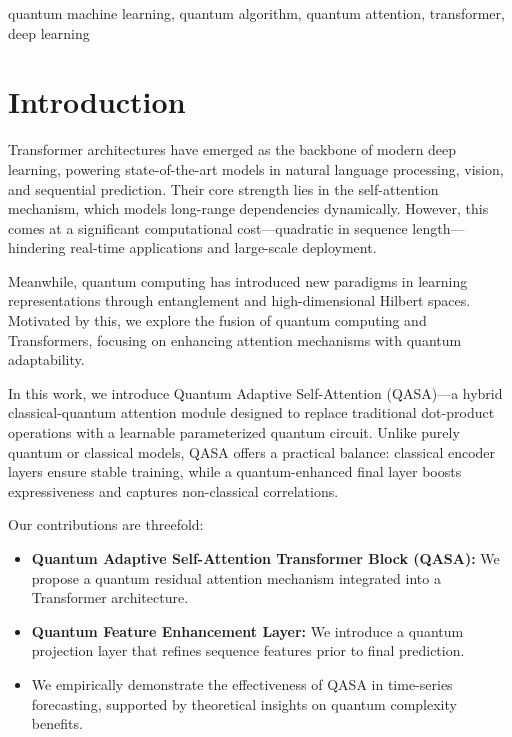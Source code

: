 \documentclass[conference]{IEEEtran}
\begin{document}
\begin{IEEEkeywords}
quantum machine learning, quantum algorithm, quantum attention, transformer, deep learning
\end{IEEEkeywords}

\section{Introduction}
Transformer architectures \cite{vaswani2017attention} have emerged as the backbone of modern deep learning, powering state-of-the-art models in natural language processing, vision, and sequential prediction. Their core strength lies in the self-attention mechanism, which models long-range dependencies dynamically. However, this comes at a significant computational cost—quadratic in sequence length—hindering real-time applications and large-scale deployment.

Meanwhile, quantum computing has introduced new paradigms in learning representations through entanglement and high-dimensional Hilbert spaces. Motivated by this, we explore the fusion of quantum computing and Transformers, focusing on enhancing attention mechanisms with quantum adaptability.

In this work, we introduce Quantum Adaptive Self-Attention (QASA)—a hybrid classical-quantum attention module designed to replace traditional dot-product operations with a learnable parameterized quantum circuit. Unlike purely quantum or classical models, QASA offers a practical balance: classical encoder layers ensure stable training, while a quantum-enhanced final layer boosts expressiveness and captures non-classical correlations.

Our contributions are threefold:

\begin{itemize}
    \item \textbf{Quantum Adaptive Self-Attention Transformer Block (QASA):} 
    We propose a quantum residual attention mechanism integrated into a Transformer architecture.

    \item \textbf{Quantum Feature Enhancement Layer:} 
    We introduce a quantum projection layer that refines sequence features prior to final prediction.

    \item We empirically demonstrate the effectiveness of QASA in time-series forecasting, supported by theoretical insights on quantum complexity benefits.


\end{itemize}
\end{document}

